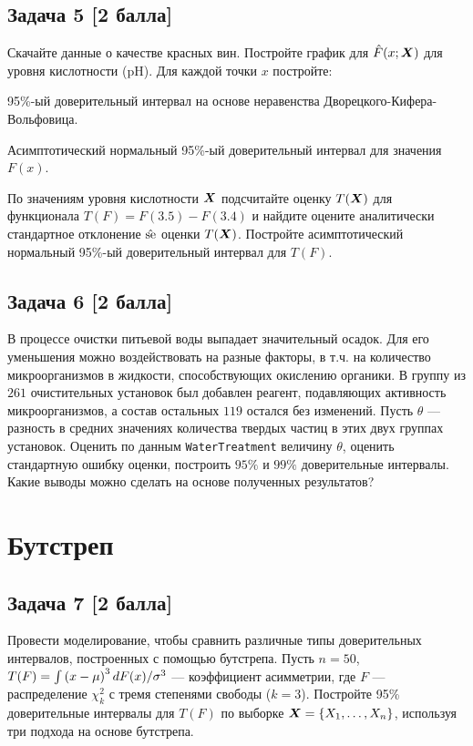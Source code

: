 \documentclass{article}
\renewenvironment{itemize}[1]{\begin{compactitem}#1}{\end{compactitem}}
\begin{document}
\subsection*{Задача 5 [2 балла]}
Скачайте данные о качестве красных вин. Постройте график для $\hat{F}(x;\boldsymbol{X})$ для уровня кислотности (pH). Для каждой точки $x$ постройте:
\begin{itemize}
	\item 95\%-ый доверительный интервал на основе неравенства Дворецкого-Кифера-Вольфовица.
	\item Асимптотический нормальный 95\%-ый доверительный интервал для значения $F(x)$.
\end{itemize}
По значениям уровня кислотности $\boldsymbol{X}$ подсчитайте оценку $T(\boldsymbol{X})$ для функционала $T(F) = F(3.5) - F(3.4)$ и найдите оцените аналитически стандартное отклонение $\hat{\mathrm{se}}$ оценки $T(\boldsymbol{X})$. Постройте асимптотический нормальный 95\%-ый доверительный интервал для $T(F)$.

\subsection*{Задача 6 [2 балла]}
В процессе очистки питьевой воды выпадает значительный осадок. Для его уменьшения можно воздействовать на разные факторы,
в т.ч. на количество микроорганизмов в жидкости, способствующих окислению органики. В группу из $261$ очистительных установок
был добавлен реагент, подавляющих активность микроорганизмов, а состав остальных $119$ остался без изменений.
Пусть $\theta$ --- разность в средних значениях количества твердых частиц в этих двух группах установок.
Оценить по данным \texttt{WaterTreatment} величину $\theta$, оценить стандартную ошибку оценки, построить
$95\%$ и $99\%$ доверительные интервалы. Какие выводы можно сделать на основе полученных результатов?

\section*{Бутстреп}
\subsection*{Задача 7 [2 балла]}
Провести моделирование, чтобы сравнить различные типы доверительных интервалов, построенных с помощью бутстрепа. Пусть $n = 50$, $T(F) = {\int\left( x-\mu\right)^3dF(x)} / \sigma^{3}$ --- коэффициент асимметрии, где $F$ --- распределение $\chi_k^2$ с тремя степенями свободы ($k = 3$). Постройте 95\% доверительные интервалы для $T(F)$ по выборке $\boldsymbol{X} = \{X_1,\ldots,X_n\}$, используя три подхода на основе бутстрепа.
	
\end{document}

